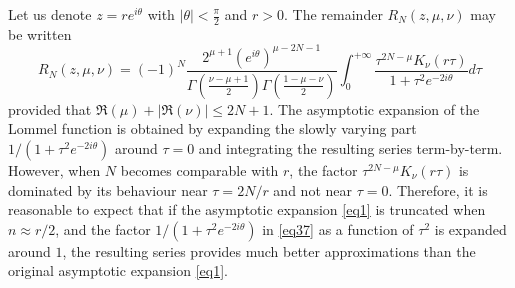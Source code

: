 \documentclass[a4paper,twoside,10pt]{amsart}
\numberwithin{equation}{section}
\begin{document}
Let us denote $z = re^{i\theta }$ with $\left|\theta\right|<\frac{\pi}{2}$ and $r>0$. The remainder $R_N \left( {z,\mu ,\nu } \right)$ may be written
\begin{equation}\label{eq37}
R_N \left( {z,\mu ,\nu } \right) = \left( { - 1} \right)^N \frac{{2^{\mu  + 1} \left( {e^{i\theta } } \right)^{\mu  - 2N - 1} }}{{\Gamma \left( {\frac{{\nu  - \mu  + 1}}{2}} \right)\Gamma \left( {\frac{{1 - \mu  - \nu }}{2}} \right)}}\int_0^{ + \infty } {\frac{{\tau ^{2N - \mu } K_\nu  \left( {r\tau } \right)}}{{1 + \tau ^2 e^{ - 2i\theta } }}d\tau } 
\end{equation}
provided that $\Re \left( \mu  \right) + \left| {\Re \left( \nu  \right)} \right| \le 2N + 1$. The asymptotic expansion of the Lommel function is obtained by expanding the slowly varying part $1/\left(1 + \tau ^2 e^{ - 2i\theta }\right)$ around $\tau=0$ and integrating the resulting series term-by-term. However, when $N$ becomes comparable with $r$, the factor $\tau ^{2N - \mu } K_\nu  \left( {r\tau } \right)$ is dominated by its behaviour near $\tau  = 2N/r$ and not near $\tau=0$. Therefore, it is reasonable to expect that if the asymptotic expansion \eqref{eq1} is truncated when $n\approx r/2$, and the factor $1/\left(1 + \tau ^2 e^{ - 2i\theta }\right)$ in \eqref{eq37} as a function of $\tau^2$ is expanded around $1$, the resulting series provides much better approximations than the original asymptotic expansion \eqref{eq1}.
\end{document}

